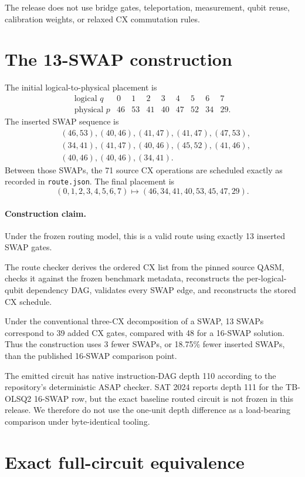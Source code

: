 \documentclass[11pt]{article}
\begin{document}
The release does not use bridge gates, teleportation, measurement, qubit
reuse, calibration weights, or relaxed CX commutation rules.

\section{The 13-SWAP construction}

The initial logical-to-physical placement is
\[
\begin{array}{c|rrrrrrrr}
\text{logical }q & 0&1&2&3&4&5&6&7\\ \hline
\text{physical }p&46&53&41&40&47&52&34&29.
\end{array}
\]
The inserted SWAP sequence is
\[
\begin{split}
&(46,53),(40,46),(41,47),(41,47),(47,53),\\
&(34,41),(41,47),(40,46),(45,52),(41,46),\\
&(40,46),(40,46),(34,41).
\end{split}
\]
Between those SWAPs, the 71 source CX operations are scheduled exactly as
recorded in \texttt{route.json}.  The final placement is
\[
(0,1,2,3,4,5,6,7)\mapsto(46,34,41,40,53,45,47,29).
\]

\paragraph{Construction claim.}
Under the frozen routing model, this is a valid route using exactly 13 inserted
SWAP gates.

The route checker derives the ordered CX list from the pinned source QASM,
checks it against the frozen benchmark metadata, reconstructs the
per-logical-qubit dependency DAG, validates every SWAP edge, and reconstructs
the stored CX schedule.

Under the conventional three-CX decomposition of a SWAP, 13 SWAPs correspond
to 39 added CX gates, compared with 48 for a 16-SWAP solution.  Thus the
construction uses 3 fewer SWAPs, or 18.75\% fewer inserted SWAPs, than the
published 16-SWAP comparison point.

The emitted circuit has native instruction-DAG depth 110 according to the
repository's deterministic ASAP checker.  SAT 2024 reports depth 111 for the
TB-OLSQ2 16-SWAP row, but the exact baseline routed circuit is not frozen in
this release.  We therefore do not use the one-unit depth difference as a
load-bearing comparison under byte-identical tooling.

\section{Exact full-circuit equivalence}
\end{document}
